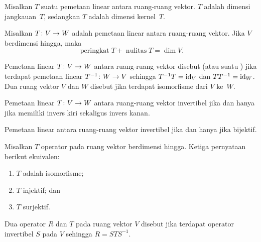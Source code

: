 \begin{defn} Misalkan $T$ suatu pemetaan linear antara ruang-ruang vektor.  $T$ adalah dimensi jangkauan~$T$, sedangkan
 $T$ adalah dimensi kernel~$T$.
\end{defn}

\begin{prop} Misalkan $T\colon V \rightarrow W$ adalah pemetaan linear antara ruang-ruang vektor. Jika $V$ berdimensi hingga, maka
  \[ \operatorname{peringkat} T + \operatorname{nulitas} T = \dim V. \]
\end{prop}

\begin{defn} Pemetaan linear $T\colon V \rightarrow W$ antara ruang-ruang vektor disebut
 (atau suatu
) jika terdapat pemetaan linear $T^{-1}\colon W \rightarrow V$ sehingga $T^{-1}T
= \operatorname{id}_{V}$ dan $TT^{-1} = \operatorname{id}_{W}$. Dua ruang vektor $V$ dan $W$ disebut
 jika terdapat isomorfisme dari $V$ ke~$W$.
\end{defn}

\begin{prop}\label{inv_lin_maps001} Pemetaan linear $T\colon V \rightarrow W$ antara ruang-ruang vektor
invertibel jika dan hanya jika memiliki invers kiri sekaligus invers kanan.
\end{prop}

\begin{prop}\label{inv_lin_maps004} Pemetaan linear antara ruang-ruang vektor invertibel jika
dan hanya jika bijektif.
\end{prop}

\begin{prop} Misalkan $T$ operator pada ruang vektor berdimensi hingga. Ketiga pernyataan berikut ekuivalen:
 \begin{enumerate}
    \item $T$ adalah isomorfisme;
    \item $T$ injektif; dan
    \item $T$ surjektif.
 \end{enumerate}
\end{prop}

 \begin{defn}\label{defn_similar_vs_ops} Dua operator $R$ dan $T$ pada ruang vektor $V$ disebut
 jika terdapat operator invertibel $S$ pada $V$ sehingga $R = STS^{-1}$.
\end{defn}

